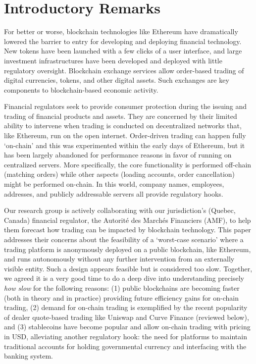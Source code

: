 
\section{Introductory Remarks}

For better or worse, blockchain technologies like Ethereum have dramatically lowered the barrier to entry for developing and deploying financial technology. New tokens have been launched with a few clicks of a user interface, and large investment infrastructures have been developed and deployed with little regulatory oversight. Blockchain exchange services allow order-based trading of digital currencies, tokens, and other digital assets. Such exchanges are key components to blockchain-based economic activity. 

Financial regulators seek to provide consumer protection during the issuing and trading of financial products and assets. They are concerned by their limited ability to intervene when trading is conducted on decentralized networks that, like Ethereum, run on the open internet. Order-driven trading can happen fully `on-chain' and this was experimented within the early days of Ethereum, but it has been largely abandoned for performance reasons in favor of running on centralized servers. More specifically, the core functionality is performed off-chain (\eg matching orders) while other aspects (\eg loading accounts, order cancellation) might be performed on-chain. In this world, company names, employees, addresses, and publicly addressable servers all provide regulatory hooks.

Our research group is actively collaborating with our jurisdiction's (Quebec, Canada) financial regulator, the Autorité des Marchés Financiers (AMF), to help them forecast how trading can be impacted by blockchain technology. This paper addresses their concerns about the feasibility of a `worst-case scenario' where a trading platform is anonymously deployed on a public blockchain, like Ethereum, and runs autonomously without any further intervention from an externally visible entity. Such a design appears feasible but is considered too slow. Together, we agreed it is a very good time to do a deep dive into understanding precisely \textit{how slow} for the following reasons: (1) public blockchains are becoming faster (both in theory and in practice) providing future efficiency gains for on-chain trading, (2) demand for on-chain trading is exemplified by the recent popularity of dealer quote-based trading like Uniswap and Curve Finance (reviewed below), and (3) stablecoins have become popular and allow on-chain trading with pricing in USD, alleviating another regulatory hook: the need for platforms to maintain traditional accounts for holding governmental currency and interfacing with the banking system.

